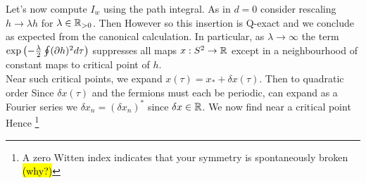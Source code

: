 \documentclass{article}
\begin{document}
Let's now compute $I_w$ using the path integral. As in $d=0$ consider rescaling $h \to \lambda h$ for $\lambda \in \mathbb{R}_{>0}$. Then 
However 
so this insertion is Q-exact and we conclude 
as expected from the canonical calculation. In particular, as $\lambda \to \infty$ the term $\exp\left( -\frac{\lambda}{2} \oint (\partial h)^2 d\tau \right)$ suppresses all maps $x:S^2\to\mathbb{R}$ except in a neighbourhood of constant maps to critical point of $h$. \\
Near such critical points, we expand $x(\tau) = x_\ast + \delta x (\tau)$. Then to quadratic order 
Since $\delta x(\tau)$ and the fermions must each be periodic, can expand as a Fourier series
we $\delta x_n = (\delta x_n)^\ast $ since $\delta x \in \mathbb{R}$. We now find near a critical point 
Hence 
\footnote{A zero Witten index indicates that your symmetry is spontaneously broken \hl{(why?)}}

\end{document}
